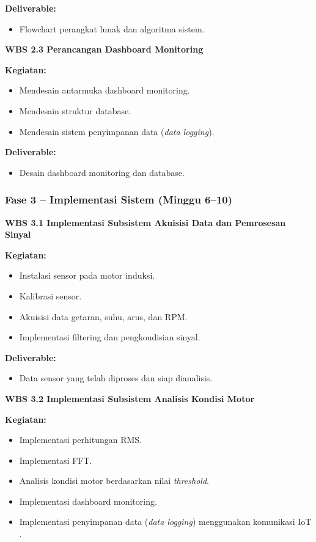 \documentclass{elsinta}
\begin{document}
\textbf{Deliverable:}
\begin{itemize}
    \item Flowchart perangkat lunak dan algoritma sistem.
\end{itemize}

\textbf{WBS 2.3 Perancangan Dashboard Monitoring}

\textbf{Kegiatan:}
\begin{itemize}
    \item Mendesain antarmuka dashboard monitoring.
    \item Mendesain struktur database.
    \item Mendesain sistem penyimpanan data (\textit{data logging}).
\end{itemize}

\textbf{Deliverable:}
\begin{itemize}
    \item Desain dashboard monitoring dan database.
\end{itemize}

\subsubsection*{Fase 3 -- Implementasi Sistem (Minggu 6--10)}

\textbf{WBS 3.1 Implementasi Subsistem Akuisisi Data dan Pemrosesan Sinyal}

\textbf{Kegiatan:}
\begin{itemize}
    \item Instalasi sensor pada motor induksi.
    \item Kalibrasi sensor.
    \item Akuisisi data getaran, suhu, arus, dan RPM.
    \item Implementasi filtering dan pengkondisian sinyal.
\end{itemize}

\textbf{Deliverable:}
\begin{itemize}
    \item Data sensor yang telah diproses dan siap dianalisis.
\end{itemize}

\textbf{WBS 3.2 Implementasi Subsistem Analisis Kondisi Motor}

\textbf{Kegiatan:}
\begin{itemize}
    \item Implementasi perhitungan RMS.
    \item Implementasi FFT.
    \item Analisis kondisi motor berdasarkan nilai \textit{threshold}.
   \item Implementasi dashboard monitoring.
\item Implementasi penyimpanan data (\textit{data logging}) menggunakan komunikasi IoT \cite{bahga2014,mqtt311}.
\end{itemize}
\end{document}
